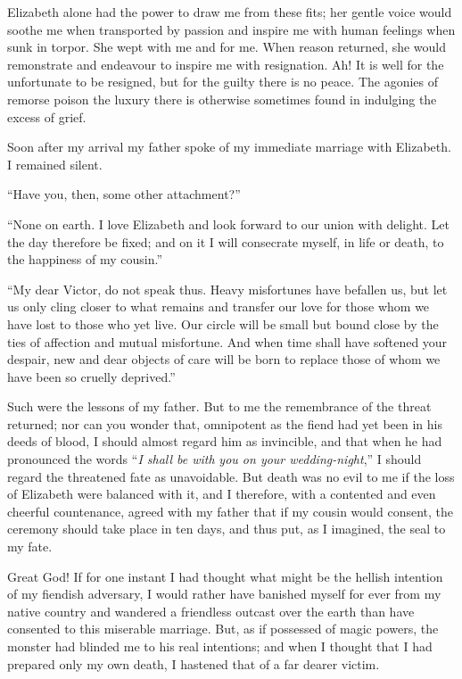 \documentclass[12pt,openright]{book}
\begin{document}
Elizabeth alone had the power to draw me from these fits; her gentle voice would soothe me when transported by passion and inspire me with human feelings when sunk in torpor. She wept with me and for me. When reason returned, she would remonstrate and endeavour to inspire me with resignation. Ah! It is well for the unfortunate to be resigned, but for the guilty there is no peace. The agonies of remorse poison the luxury there is otherwise sometimes found in indulging the excess of grief.

Soon after my arrival my father spoke of my immediate marriage with Elizabeth. I remained silent.

“Have you, then, some other attachment?”

“None on earth. I love Elizabeth and look forward to our union with delight. Let the day therefore be fixed; and on it I will consecrate myself, in life or death, to the happiness of my cousin.”

“My dear Victor, do not speak thus. Heavy misfortunes have befallen us, but let us only cling closer to what remains and transfer our love for those whom we have lost to those who yet live. Our circle will be small but bound close by the ties of affection and mutual misfortune. And when time shall have softened your despair, new and dear objects of care will be born to replace those of whom we have been so cruelly deprived.”

Such were the lessons of my father. But to me the remembrance of the threat returned; nor can you wonder that, omnipotent as the fiend had yet been in his deeds of blood, I should almost regard him as invincible, and that when he had pronounced the words “\textit{I shall be with}\textit{ }\textit{you on your wedding-night},” I should regard the threatened fate as unavoidable. But death was no evil to me if the loss of Elizabeth were balanced with it, and I therefore, with a contented and even cheerful countenance, agreed with my father that if my cousin would consent, the ceremony should take place in ten days, and thus put, as I imagined, the seal to my fate.

Great God! If for one instant I had thought what might be the hellish intention of my fiendish adversary, I would rather have banished myself for ever from my native country and wandered a friendless outcast over the earth than have consented to this miserable marriage. But, as if possessed of magic powers, the monster had blinded me to his real intentions; and when I thought that I had prepared only my own death, I hastened that of a far dearer victim.
\end{document}

